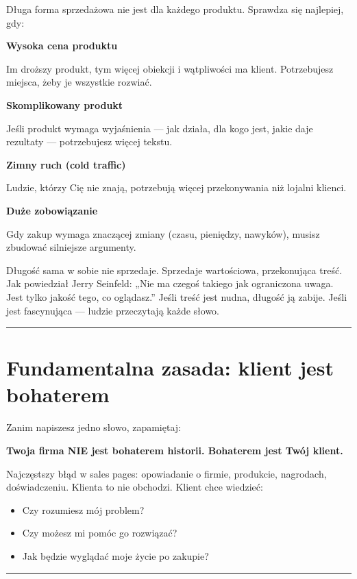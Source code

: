 \documentclass[
  12pt,
  a4paper,
  twoside,
  openright,
  12pt,
  DIV=12,
  BCOR=12mm]{scrbook}
\providecommand{\tightlist}{%
  \setlength{\itemsep}{0pt}\setlength{\parskip}{0pt}}\usepackage{longtable,booktabs,array}
\newcommand{\decoline}{%
  \begin{center}
    \textcolor{bordergray}{\rule{0.3\textwidth}{0.5pt}}
  \end{center}
}
\begin{document}
Długa forma sprzedażowa nie jest dla każdego produktu. Sprawdza się
najlepiej, gdy:

\textbf{Wysoka cena produktu}

Im droższy produkt, tym więcej obiekcji i wątpliwości ma klient.
Potrzebujesz miejsca, żeby je wszystkie rozwiać.

\textbf{Skomplikowany produkt}

Jeśli produkt wymaga wyjaśnienia --- jak działa, dla kogo jest, jakie
daje rezultaty --- potrzebujesz więcej tekstu.

\textbf{Zimny ruch (cold traffic)}

Ludzie, którzy Cię nie znają, potrzebują więcej przekonywania niż
lojalni klienci.

\textbf{Duże zobowiązanie}

Gdy zakup wymaga znaczącej zmiany (czasu, pieniędzy, nawyków), musisz
zbudować silniejsze argumenty.

\begin{wazne}
Długość sama w sobie nie sprzedaje. Sprzedaje wartościowa, przekonująca treść. Jak powiedział Jerry Seinfeld: „Nie ma czegoś takiego jak ograniczona uwaga. Jest tylko jakość tego, co oglądasz.” Jeśli treść jest nudna, długość ją zabije. Jeśli jest fascynująca --- ludzie przeczytają każde słowo.
\end{wazne}

\decoline

\section{Fundamentalna zasada: klient jest
bohaterem}\label{fundamentalna-zasada-klient-jest-bohaterem}

Zanim napiszesz jedno słowo, zapamiętaj:

\textbf{Twoja firma NIE jest bohaterem historii. Bohaterem jest Twój
klient.}

Najczęstszy błąd w sales pages: opowiadanie o firmie, produkcie,
nagrodach, doświadczeniu. Klienta to nie obchodzi. Klient chce wiedzieć:

\begin{itemize}
\tightlist
\item
  Czy rozumiesz mój problem?
\item
  Czy możesz mi pomóc go rozwiązać?
\item
  Jak będzie wyglądać moje życie po zakupie?
\end{itemize}

\decoline
\end{document}
